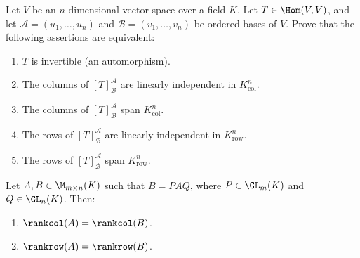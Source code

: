 \begin{exercise}
\label{exc:invertibility_characterizations_rep_matrix}
Let $V$ be an $n$-dimensional vector space over a field $K$. Let $T \in \Hom(V, V)$, and let $\mathcal{A} = (u_1, \dots, u_n)$ and $\mathcal{B} = (v_1, \dots, v_n)$ be ordered bases of $V$. Prove that the following assertions are equivalent:
\begin{enumerate}[label=\textbf{(\alph*)}]
    \item $T$ is invertible (an automorphism).
    \item The columns of $[T]_{\mathcal{B}}^{\mathcal{A}}$ are linearly independent in $K_{\mathrm{col}}^n$.
    \item The columns of $[T]_{\mathcal{B}}^{\mathcal{A}}$ span $K_{\mathrm{col}}^n$.
    \item The rows of $[T]_{\mathcal{B}}^{\mathcal{A}}$ are linearly independent in $K_{\mathrm{row}}^n$.
    \item The rows of $[T]_{\mathcal{B}}^{\mathcal{A}}$ span $K_{\mathrm{row}}^n$.
\end{enumerate}
\end{exercise}


\begin{lemma}
\label{lemma:rank_invariance_equivalence}
Let $A, B \in \M_{m \times n}(K)$ such that $B = P A Q$, where $P \in \GL_m(K)$ and $Q \in \GL_n(K)$. Then:
\begin{enumerate}[label=\textbf{(\alph*)}]
    \item $\rankcol(A) = \rankcol(B)$.
    \item $\rankrow(A) = \rankrow(B)$.
\end{enumerate}
\end{lemma}


